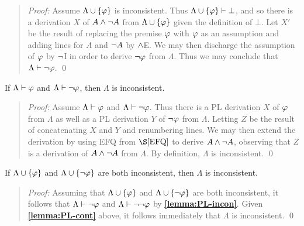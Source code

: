 \begin{quote} 
  \textit{Proof:} Assume $\Lambda\cup\lbrace\varphi\rbrace$ is inconsistent.
  Thus $\Lambda\cup\lbrace\varphi\rbrace\vdash \bot$, and so there is a derivation $X$ of $A\wedge\neg A$ from $\Lambda\cup\lbrace\varphi\rbrace$ given the definition of $\bot$. 
  Let $X'$ be the result of replacing the premise $\varphi$ with $\varphi$ as an assumption and adding lines for $A$ and $\neg A$ by $\wedge$E. 
  We may then discharge the assumption of $\varphi$ by $\neg$I in order to derive $\neg\varphi$ from $\Lambda$.
  Thus we may conclude that $\Lambda\vdash\neg\varphi$. 
  \qed
\end{quote}




\begin{Lthm} \label{lemma:PL-cont}
  If $\Lambda\vdash\varphi$ and $\Lambda\vdash\neg\varphi$, then $\Lambda$ is inconsistent. 
\end{Lthm} \vspace{-.2in}

\begin{quote} 
  \textit{Proof:} 
  Assume $\Lambda\vdash\varphi$ and $\Lambda\vdash\neg\varphi$.
  Thus there is a PL derivation $X$ of $\varphi$ from $\Lambda$ as well as a PL derivation $Y$ of $\neg\varphi$ from $\Lambda$. 
  Letting $Z$ be the result of concatenating $X$ and $Y$ and renumbering lines.
  We may then extend the derivation by using EFQ from $\S\ref{EFQ}$ to derive $A\wedge\neg A$, observing that $Z$ is a derivation of $A\wedge\neg A$ from $\Lambda$.
  By definition, $\Lambda$ is inconsistent.
  \qed
\end{quote}





\begin{Lthm} \label{lemma:PL-conin}
  If $\Lambda \cup \lbrace\varphi\rbrace$ and $\Lambda\cup \lbrace\neg\varphi\rbrace$ are both inconsistent, then $\Lambda$ is inconsistent. 
\end{Lthm} \vspace{-.2in}

\begin{quote} 
  \textit{Proof:} Assuming that $\Lambda \cup \lbrace\varphi\rbrace$ and $\Lambda\cup \lbrace\neg\varphi\rbrace$ are both inconsistent, it follows that $\Lambda\vdash \neg\varphi$ and $\Lambda\vdash\neg\neg\varphi$ by \textbf{\ref{lemma:PL-incon}}.
  Given \textbf{\ref{lemma:PL-cont}} above, it follows immediately that $\Lambda$ is inconsistent. 
  \qed
\end{quote}





